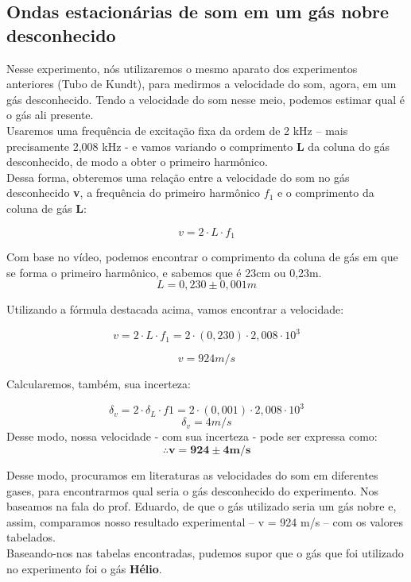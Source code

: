 \subsection{Ondas estacionárias de som em um gás nobre
desconhecido}

Nesse experimento, nós utilizaremos o mesmo aparato dos experimentos anteriores (Tubo de Kundt), para medirmos a velocidade do som, agora, em um gás desconhecido. Tendo a velocidade do som nesse meio, podemos estimar qual é o gás ali presente.\\

Usaremos uma frequência de excitação fixa da ordem de 2 kHz – mais precisamente 2,008 kHz - e vamos variando o comprimento \textbf{L} da coluna do gás desconhecido, de modo a obter o primeiro harmônico.\\

Dessa forma, obteremos uma relação entre a velocidade do som no gás desconhecido \textbf{v}, a frequência do primeiro harmônico \textbf{$f_1$} e o comprimento da coluna de gás \textbf{L}:

\[v = 2\cdot L\cdot f_1\]

Com base no vídeo, podemos encontrar o comprimento da coluna de gás em que se forma o primeiro harmônico, e sabemos que é 23cm ou 0,23m. 
\[L = 0,230 \pm 0,001 m\]

Utilizando a fórmula destacada acima, vamos encontrar a velocidade:

\[ v = 2\cdot L \cdot f_1   =   2\cdot(0,230)\cdot 2,008\cdot 10^3\]

\[v = 924 m/s\]

Calcularemos, também, sua incerteza:

\[\delta _v = 2 \cdot \delta _L \cdot f1   =   2\cdot(0,001)\cdot2,008\cdot10^3\]
\[\delta _v = 4 m/s\]
Desse modo, nossa velocidade - com sua incerteza - pode ser expressa como:
\[ \mathbf{\therefore v = 924 \pm 4 m/s} \]

Desse modo, procuramos em literaturas as velocidades do som em diferentes gases, para encontrarmos qual seria o gás desconhecido do experimento. Nos baseamos na fala do prof. Eduardo, de que o gás utilizado seria um gás nobre e, assim, comparamos nosso resultado experimental -- v = 924 m/s -- com os valores tabelados.\\



Baseando-nos nas tabelas encontradas, pudemos supor que o gás que foi utilizado no experimento foi o gás \textbf{Hélio}.\\

